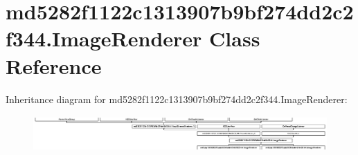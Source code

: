 \hypertarget{classmd5282f1122c1313907b9bf274dd2c2f344_1_1ImageRenderer}{}\section{md5282f1122c1313907b9bf274dd2c2f344.\+Image\+Renderer Class Reference}
\label{classmd5282f1122c1313907b9bf274dd2c2f344_1_1ImageRenderer}
Inheritance diagram for md5282f1122c1313907b9bf274dd2c2f344.\+Image\+Renderer\+:\begin{figure}[H]
\begin{center}
\leavevmode
\includegraphics[height=1.372549cm]{classmd5282f1122c1313907b9bf274dd2c2f344_1_1ImageRenderer}
\end{center}
\end{figure}
